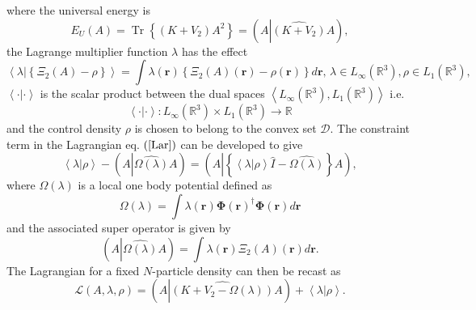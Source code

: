 \documentclass[aps,preprint]{revtex4}%
\begin{document}
where the universal energy is
\begin{equation}
E_{U}\left(  A\right)  =\operatorname{Tr}\left\{  \left(  K+V_{2}\right)
A^{2}\right\}  =\left(  A\left\vert \widehat{\left(  K+V_{2}\right)
}A\right.  \right)  ,
\end{equation}
the Lagrange multiplier function $\lambda$ has the effect
\begin{equation}
\left\langle \left.  \lambda\right\vert \left\{  \Xi_{2}\left(  A\right)
-\rho\right\}  \right\rangle =\int\lambda\left(  \boldsymbol{r}\right)
\left\{  \Xi_{2}\left(  A\right)  \left(  \boldsymbol{r}\right)  -\rho\left(
\boldsymbol{r}\right)  \right\}  d\boldsymbol{r,\,}\lambda\in L_{\infty
}\left(  \mathbb{R}^{3}\right)  ,\rho\in L_{1}\left(  \mathbb{R}^{3}\right)  ,
\end{equation}
$\left\langle \cdot|\cdot\right\rangle $ is the scalar product between the
dual spaces $\left\langle L_{\infty}\left(  \mathbb{R}^{3}\right)
,L_{1}\left(  \mathbb{R}^{3}\right)  \right\rangle $ i.e.
\begin{equation}
\left\langle \cdot|\cdot\right\rangle :L_{\infty}\left(  \mathbb{R}%
^{3}\right)  \times L_{1}\left(  \mathbb{R}^{3}\right)  \rightarrow\mathbb{R}%
\end{equation}
and the control density $\rho$ is chosen to belong to the convex set
$\mathcal{D}.$ The constraint term in the Lagrangian eq. $\left(
\ref{Lar}\right)  $ can be developed to give
\begin{equation}
\left\langle \lambda\left\vert \rho\right.  \right\rangle -\left(  A\left\vert
\widehat{\Omega\left(  \lambda\right)  }\right.  A\right)  =\left(
A\left\vert \left\{  \left\langle \lambda\left\vert \rho\right.  \right\rangle
\hat{I}-\widehat{\Omega\left(  \lambda\right)  }\right\}  \right.  A\right)  ,
\end{equation}
where $\Omega\left(  \lambda\right)  $ is a local one body potential defined
as
\begin{equation}
\Omega\left(  \lambda\right)  =\int\lambda\left(  \boldsymbol{r}\right)
\boldsymbol{\Phi}\left(  \boldsymbol{r}\right)  ^{\dagger}\boldsymbol{\Phi
}\left(  \boldsymbol{r}\right)  d\boldsymbol{r}%
\end{equation}
and the associated super operator is given by
\begin{equation}
\left(  A\left\vert \widehat{\Omega\left(  \lambda\right)  }\right.  A\right)
=\int\lambda\left(  \boldsymbol{r}\right)  \Xi_{2}\left(  A\right)  \left(
\boldsymbol{r}\right)  d\boldsymbol{r.}%
\end{equation}
The Lagrangian for a fixed $N$-particle density can then be recast as
\begin{equation}
\mathcal{L}\left(  A,\lambda,\rho\right)  =\left(  A\left\vert \widehat
{\left(  K+V_{2}-\Omega\left(  \lambda\right)  \right)  }A\right.  \right)
+\left\langle \lambda\left\vert \rho\right.  \right\rangle .
\end{equation}
\end{document}
